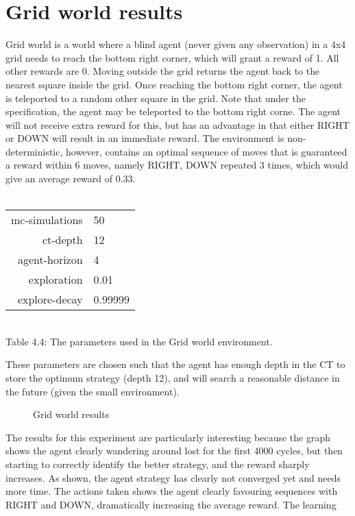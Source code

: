 \documentclass[pdftex,twoside,a4paper]{report}
\begin{document}
\section{Grid world results}
Grid world is a world where a blind agent (never given any observation) in a 4x4 grid needs to reach the bottom right corner, which will grant a reward of 1. All other rewards are 0. Moving outside the grid returns the agent back to the nearest square inside the grid. Once reaching the bottom right corner, the agent is teleported to a random other square in the grid. Note that under the specification, the agent may be teleported to the bottom right corne. The agent will not receive extra reward for this, but has an advantage in that either RIGHT or DOWN will result in an immediate reward. The environment is non-deterministic, however, contains an optimal sequence of moves that is guaranteed a reward within 6 moves, namely RIGHT, DOWN repeated 3 times, which would give an average reward of 0.33.\\\\
\begin{center}
\begin{tabular}{| r | l | }
\hline
mc-simulations & 50\\
ct-depth & 12\\
agent-horizon & 4\\
exploration & 0.01\\
explore-decay & 0.99999\\
\hline
\end{tabular}\\
\vspace{0.5mm}
Table 4.4: The parameters used in the Grid world environment.
\end{center}
These parameters are chosen such that the agent has enough depth in the CT to store the optimum strategy (depth 12), and will search a reasonable distance in the future (given the small environment).

 \begin{figure}[h]
   \begin{center}
   \end{center}
   \caption{Grid world results}
   \label{fig:grid_results}
 \end{figure}
The results for this experiment are particularly interesting because the graph shows the agent clearly wandering around lost for the first 4000 cycles, but then starting to correctly identify the better strategy, and the reward sharply increases. As shown, the agent strategy has clearly not converged yet and needs more time. The actions taken shows the agent clearly favouring sequences with RIGHT and DOWN, dramatically increasing the average reward. The learning 
\end{document}
